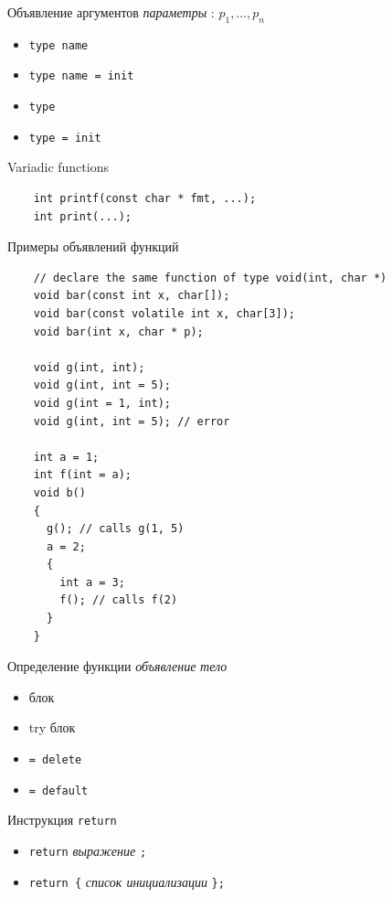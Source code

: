 \documentclass[unknownkeysallowed,xcolor=table]{beamer}
\begin{document}
\begin{frame}[fragile]{Объявление аргументов}
  \emph{параметры} : $p_1, \dotso , p_n$

  \vspace{1em}

  \begin{itemize}
    \item \lstinline{type name} \vspace{0.5em}
    \item \lstinline{type name = init} \vspace{0.5em}
    \item \lstinline{type} \vspace{0.5em}
    \item \lstinline{type = init}
  \end{itemize}

  \vspace{1em}

  Variadic functions
  \begin{lstlisting}
    int printf(const char * fmt, ...);
    int print(...);
  \end{lstlisting}
\end{frame}

\begin{frame}[fragile]{Примеры объявлений функций}
  \begin{lstlisting}
    // declare the same function of type void(int, char *)
    void bar(const int x, char[]);
    void bar(const volatile int x, char[3]);
    void bar(int x, char * p);

    void g(int, int);
    void g(int, int = 5);
    void g(int = 1, int);
    void g(int, int = 5); // error

    int a = 1;
    int f(int = a);
    void b()
    {
      g(); // calls g(1, 5)
      a = 2;
      {
        int a = 3;
        f(); // calls f(2)
      }
    }
  \end{lstlisting}
\end{frame}

\begin{frame}[fragile]{Определение функции}
  \emph{объявление} \emph{тело}

  \vspace{1em}

  \begin{itemize}
    \item блок \vspace{0.7em}
    \item try блок \vspace{0.7em}
    \item \lstinline{= delete} \vspace{0.7em}
    \item \lstinline{= default}
  \end{itemize}
\end{frame}

\begin{frame}[fragile]{Инструкция \lstinline{return}}
  \begin{itemize}
    \item \lstinline{return} \emph{выражение} \lstinline{;} \vspace{1em}
    \item \lstinline|return {| \emph{список инициализации} \lstinline|};|
  \end{itemize}
\end{frame}
\end{document}
